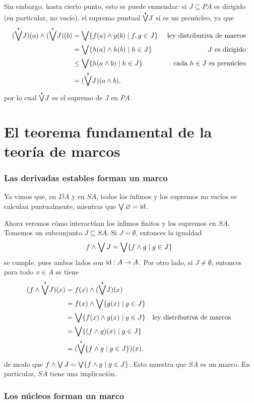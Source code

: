Sin embargo, hasta cierto punto, esto se puede enmendar:
si $J\subseteq PA$ es dirigido (en particular, no vacío), el supremo
puntual $\pSup J$ sí es un prenúcleo, ya que
  \begin{align*}
    (\pSup J)(a) \inf (\pSup J)(b)
    &= \Sup\{f(a)\inf g(b) \mid f,g\in J\}
      & \text{ ley distributiva de marcos} \\
    &= \Sup\{h(a) \inf h(b)  \mid h\in J \}
      & \text{ $J$ es dirigido} \\
    &\leq \Sup\{h(a \inf b)  \mid h\in J \}
      & \text{ cada $h\in J$ es prenúcleo} \\
    &= (\pSup J)(a\inf b),
  \end{align*}
por lo cual $\pSup J$ es el supremo de $J$ en $PA$.

\section{El teorema fundamental de la teoría de marcos}

\subsubsection{Las derivadas estables forman un marco}

Ya vimos que, en $DA$ y en $SA$, todos los ínfimos
y los supremos no vacíos se calculan puntualmente,
mientras que $\bigvee\varnothing=\mathrm{id}$.


Ahora veremos cómo interactúan los ínfimos finitos
y los supremos en $SA$.
Tomemos un subconjunto $J\subseteq SA$.
Si $J=\emptyset$, entonces la igualdad
\[
  f\wedge \bigvee J = \bigvee\{f\wedge g \mid g\in J\}
\]
se cumple, pues ambos lados son $\mathrm{id}:A\to A$.
Por otro lado, si $J\neq\emptyset$, entonces para todo $x\in A$
se tiene
\begin{align*}
  (f\inf \pSup J)(x)
  &= f(x)\inf (\pSup J)(x) \\
  &= f(x)\inf \Sup\{g(x) \mid g\in J\} \\
  &= \Sup\{f(x)\inf g(x) \mid g\in J\}
    & \text{ley distributiva de marcos} \\
  &= \Sup\{(f\inf g)(x) \mid g\in J\} \\
  &= (\pSup\{f\inf g \mid g\in J\})(x).
\end{align*}
de modo que $f\wedge\bigvee J = \bigvee\{f\wedge g\mid g\in J\}$.
Esto muestra que $SA$ es un marco.
En particular, $SA$ tiene una implicación.

\subsubsection{Los núcleos forman un marco}

